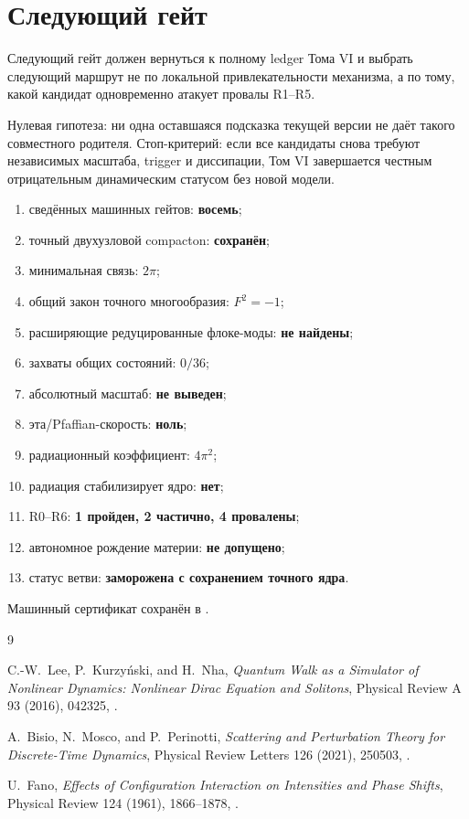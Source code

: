 \section{Следующий гейт}

Следующий гейт
должен вернуться к полному ledger Тома VI и выбрать следующий маршрут не
по локальной привлекательности механизма, а по тому, какой кандидат
одновременно атакует провалы R1--R5.

Нулевая гипотеза: ни одна оставшаяся подсказка текущей версии не даёт
такого совместного родителя. Стоп-критерий: если все кандидаты снова
требуют независимых масштаба, trigger и диссипации, Том VI завершается
честным отрицательным динамическим статусом без новой модели.

\begin{protocol}
\begin{enumerate}
 \item сведённых машинных гейтов: \textbf{восемь};
 \item точный двухузловой compacton: \textbf{сохранён};
 \item минимальная связь: \textbf{$2\pi$};
 \item общий закон точного многообразия: \textbf{$F^2=-1$};
 \item расширяющие редуцированные флоке-моды: \textbf{не найдены};
 \item захваты общих состояний: \textbf{$0/36$};
 \item абсолютный масштаб: \textbf{не выведен};
 \item эта/Pfaffian-скорость: \textbf{ноль};
 \item радиационный коэффициент: \textbf{$4\pi^2$};
 \item радиация стабилизирует ядро: \textbf{нет};
 \item R0--R6: \textbf{1 пройден, 2 частично, 4 провалены};
 \item автономное рождение материи: \textbf{не допущено};
 \item статус ветви: \textbf{заморожена с сохранением точного ядра}.
\end{enumerate}
\end{protocol}

Машинный сертификат сохранён в
.

\begin{thebibliography}{9}\raggedright
{}
C.-W.~Lee, P.~Kurzyński, and H.~Nha,
\emph{Quantum Walk as a Simulator of Nonlinear Dynamics: Nonlinear Dirac
Equation and Solitons}, Physical Review A 93 (2016), 042325,
.

A.~Bisio, N.~Mosco, and P.~Perinotti,
\emph{Scattering and Perturbation Theory for Discrete-Time Dynamics},
Physical Review Letters 126 (2021), 250503,
.

U.~Fano,
\emph{Effects of Configuration Interaction on Intensities and Phase Shifts},
Physical Review 124 (1961), 1866--1878,
.
\end{thebibliography}